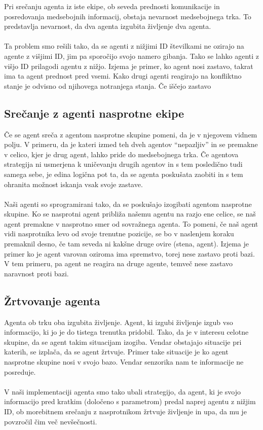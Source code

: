 \documentclass[12pt,a4paper,openany]{book}
\begin{document}
Pri srečanju agenta iz iste ekipe, ob seveda prednosti komunikacije in posredovanja  medsebojnih informacij, 
obstaja nevarnost medsebojnega trka. To predstavlja nevarnost, da dva agenta izgubita življenje dva agenta.\\
\\
Ta problem smo rešili tako, da se agenti z nižjimi ID številkami ne ozirajo na agente z višjimi ID, jim pa 
sporočijo svojo namero gibanja. Tako se lahko agenti z višjo ID prilagodi agentu z nižjo. Izjema je primer, 
ko agent nosi zastavo, takrat ima ta agent prednost pred vsemi. Kako drugi agenti reagirajo na konfliktno 
stanje je odvisno od njihovega notranjega stanja. Če iščejo zastavo 

\subsection{Srečanje z agenti nasprotne ekipe}
Če se agent sreča z agentom nasprotne skupine pomeni, da je v njegovem vidnem polju. V primeru, da je kateri
izmed teh dveh agentov “nepazljiv” in se premakne v celico, kjer je drug agent, lahko pride do medsebojnega 
trka. Če agentova strategija ni usmerjena k uničevanju drugih agentov in s tem posledično tudi samega sebe, 
je edina logična pot ta, da se agenta poskušata zaobiti in s tem ohranita možnost iskanja vsak svoje zastave.\\
\\
Naši agenti so sprogramirani tako, da se poskušajo izogibati agentom nasprotne skupine. Ko se nasprotni
agent približa našemu agentu na razjo ene celice, se naš agent premakne v nasprotno smer od sovražnega agenta.
To pomeni, če naš agent vidi nasprotnika levo od svoje trenutne pozicije, se bo v naslenjem koraku premaknil desno,
če tam seveda ni kakšne druge ovire (stena, agent). Izjema je primer ko je agent varovan oziroma ima spremstvo,
torej nese zastavo proti bazi. V tem primeru, pa agent ne reagira na druge agente, temveč nese zastavo naravnost
proti bazi.


\subsection{Žrtvovanje agenta} 
Agenta ob trku oba izgubita življenje. Agent, ki izgubi življenje izgub vso informacijo, ki jo je do
tistega trenutka pridobil. Tako, da je v interesu celotne skupine, da se agent takim situacijam izogiba.
Vendar obstajajo situacije pri katerih, se izplača, da se agent žrtvuje. Primer take situacije je ko agent
nasprotne skupine nosi v svojo bazo. Vendar senzorika nam te informacije ne posreduje.\\
\\
V naši implementaciji agenta smo tako ubali strategijo, da agent, ki je svojo informacijo pred kratkim
(določeno s parametrom) predal naprej agentu z nižjim ID, ob morebitnem srečanju z nasprotnikom žrtvuje
življenje in upa, da mu je povzročil čim več nevšečnosti.
\newpage



\listoffigures

\newpage
\end{document}
